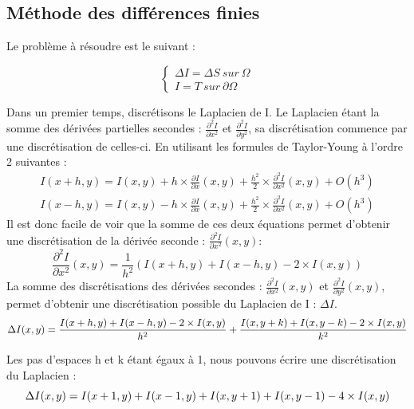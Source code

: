 \subsection{Méthode des différences finies }
Le problème à résoudre est le suivant : 
\begin{center}

\begin{equation*}
    \left \{
    \begin{aligned}
    \Delta I = \Delta S \ sur \ \Omega\\
    I = T \ sur \ \partial \Omega
    \end{aligned}
    \right.
\end{equation*}
\end{center}
Dans un premier temps, discrétisons le Laplacien de I. Le Laplacien étant la somme des dérivées partielles secondes : $\frac{\partial^2 I}{\partial x^2}$ et  $\frac{\partial^2 I}{\partial y^2}$, sa discrétisation commence par une discrétisation de celles-ci. En utilisant les formules de Taylor-Young à l'ordre 2 suivantes :
\begin{equation*}
\begin{aligned}
    I(x+h,y) = I(x,y)+h\times \frac{\partial I}{\partial x}(x,y)+ \frac{h^2}{2} \times \frac{\partial ^2 I}{\partial x^2}(x,y) + O(h^3) \\
    I(x-h,y) =I(x,y)- h\times  \frac{\partial I}{\partial x}(x,y)+ \frac{h^2}{2} \times \frac{\partial^2 I}{\partial x^2}(x,y) + O(h^3)
\end{aligned}
\end{equation*}
Il est donc facile de voir que la somme de ces deux équations permet d'obtenir une discrétisation de la dérivée seconde : $\frac{\partial ^2 I}{\partial x^2}(x,y)$:  
\begin{equation*}
    \frac{\partial ^2 I}{\partial x^2}(x,y) =\frac{1}{h^2}\left( I(x+h,y) + I(x-h,y) - 2\times I(x,y)\right)
\end{equation*}
La somme des discrétisations des dérivées secondes : $\frac{\partial ^2 I}{\partial x^2}(x,y)$ et $\frac{\partial ^2 I}{\partial y^2}(x,y)$, permet d'obtenir une discrétisation possible du Laplacien de I : $\Delta I$.
\begin{equation*}
    \Delta I(x,y) =  \frac{I(x+h,y) + I(x-h,y) - 2\times I(x,y)}{h^2}  + \frac{I(x,y+k) + I(x,y-k) - 2\times I(x,y)}{k^2} \\
\end{equation*}

Les pas d'espaces h et k étant égaux à 1, nous pouvons écrire une discrétisation du Laplacien  :
\begin{equation*}
     \Delta I(x,y) =  I(x+1,y) + I(x-1,y)+ I(x,y+1) + I(x,y-1) - 4\times I(x,y)  \\
\end{equation*}

